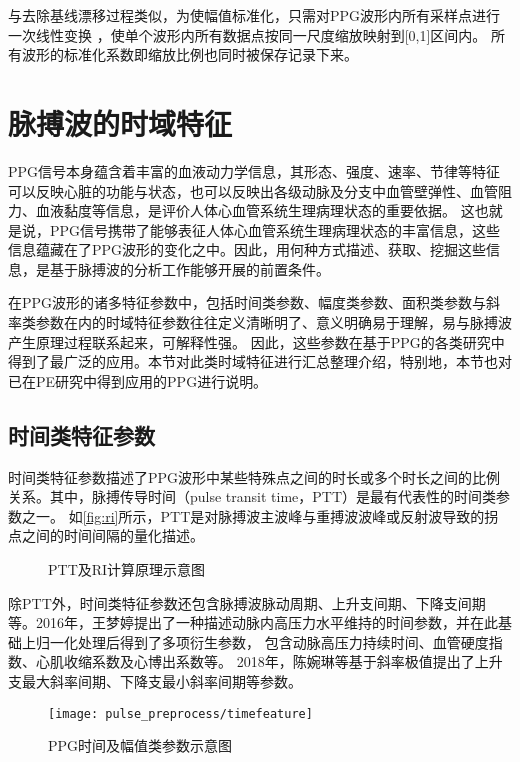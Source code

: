 与去除基线漂移过程类似，为使幅值标准化，只需对PPG波形内所有采样点进行一次线性变换
，使单个波形内所有数据点按同一尺度缩放映射到[0,1]区间内。
所有波形的标准化系数即缩放比例也同时被保存记录下来。

\section{脉搏波的时域特征}
PPG信号本身蕴含着丰富的血液动力学信息，其形态、强度、速率、节律等特征可以反映心脏的功能与状态，也可以反映出各级动脉及分支中血管壁弹性、血管阻力、血液黏度等信息，是评价人体心血管系统生理病理状态的重要依据\cite{PPGYY}。
这也就是说，PPG信号携带了能够表征人体心血管系统生理病理状态的丰富信息，这些信息蕴藏在了PPG波形的变化之中。因此，用何种方式描述、获取、挖掘这些信息，是基于脉搏波的分析工作能够开展的前置条件。

在PPG波形的诸多特征参数中，包括时间类参数、幅度类参数、面积类参数与斜率类参数在内的时域特征参数往往定义清晰明了、意义明确易于理解，易与脉搏波产生原理过程联系起来，可解释性强。
因此，这些参数在基于PPG的各类研究中得到了最广泛的应用\cite{cwl,mmt}。本节对此类时域特征进行汇总整理介绍，特别地，本节也对已在PE研究中得到应用的PPG进行说明。

\subsection{时间类特征参数}
时间类特征参数描述了PPG波形中某些特殊点之间的时长或多个时长之间的比例关系。其中，脉搏传导时间（pulse transit time，PTT）是最有代表性的时间类参数之一\cite{Brumfield2005,Su2014}。
如\autoref{fig:ri}所示，PTT是对脉搏波主波峰与重搏波波峰或反射波导致的拐点之间的时间间隔的量化描述。
\begin{figure}[htbp]
    \centering
    \quad
    \caption[PTT及RI计算原理示意图]{\label{fig:ri}PTT及RI计算原理示意图\cite{Su2014}}
\end{figure}

除PTT外，时间类特征参数还包含脉搏波脉动周期、上升支间期、下降支间期等。2016年，王梦婷\cite{mmt}提出了一种描述动脉内高压力水平维持的时间参数，并在此基础上归一化处理后得到了多项衍生参数，
包含动脉高压力持续时间、血管硬度指数、心肌收缩系数及心博出系数等。
2018年，陈婉琳等\cite{cwl}基于斜率极值提出了上升支最大斜率间期、下降支最小斜率间期等参数。
\begin{figure}[htbp]
    \centering
    \texttt{[image: pulse\_preprocess/timefeature]}
    \caption[常见的PPG时间及幅值类参数示意图]{\label{fig:timefeature}PPG时间及幅值类参数示意图}
\end{figure}

